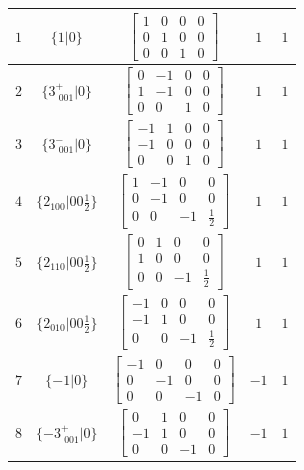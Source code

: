 \documentclass[fleqn,8pt]{jsarticle}
\begin{document}
\begin{longtable}{ccccc}
$ 1 $ & $ \{1|0\} $ & $ \begin{bmatrix} 1 & 0 & 0 & 0 \\ 0 & 1 & 0 & 0 \\ 0 & 0 & 1 & 0 \end{bmatrix} $ & $ 1 $ & $ 1 $ \\ \hline
$ 2 $ & $ \{3^{+}_{\,\,001}|0\} $ & $ \begin{bmatrix} 0 & -1 & 0 & 0 \\ 1 & -1 & 0 & 0 \\ 0 & 0 & 1 & 0 \end{bmatrix} $ & $ 1 $ & $ 1 $ \\ \hline
$ 3 $ & $ \{3^{-}_{\,\,001}|0\} $ & $ \begin{bmatrix} -1 & 1 & 0 & 0 \\ -1 & 0 & 0 & 0 \\ 0 & 0 & 1 & 0 \end{bmatrix} $ & $ 1 $ & $ 1 $ \\ \hline
$ 4 $ & $ \{2{}_{100}|0 0 \frac{1}{2}\} $ & $ \begin{bmatrix} 1 & -1 & 0 & 0 \\ 0 & -1 & 0 & 0 \\ 0 & 0 & -1 & \frac{1}{2} \end{bmatrix} $ & $ 1 $ & $ 1 $ \\ \hline
$ 5 $ & $ \{2{}_{110}|0 0 \frac{1}{2}\} $ & $ \begin{bmatrix} 0 & 1 & 0 & 0 \\ 1 & 0 & 0 & 0 \\ 0 & 0 & -1 & \frac{1}{2} \end{bmatrix} $ & $ 1 $ & $ 1 $ \\ \hline
$ 6 $ & $ \{2{}_{010}|0 0 \frac{1}{2}\} $ & $ \begin{bmatrix} -1 & 0 & 0 & 0 \\ -1 & 1 & 0 & 0 \\ 0 & 0 & -1 & \frac{1}{2} \end{bmatrix} $ & $ 1 $ & $ 1 $ \\ \hline
$ 7 $ & $ \{-1|0\} $ & $ \begin{bmatrix} -1 & 0 & 0 & 0 \\ 0 & -1 & 0 & 0 \\ 0 & 0 & -1 & 0 \end{bmatrix} $ & $ -1 $ & $ 1 $ \\ \hline
$ 8 $ & $ \{-3^{+}_{\,\,001}|0\} $ & $ \begin{bmatrix} 0 & 1 & 0 & 0 \\ -1 & 1 & 0 & 0 \\ 0 & 0 & -1 & 0 \end{bmatrix} $ & $ -1 $ & $ 1 $ \\ \hline

\end{longtable}
\end{document}
